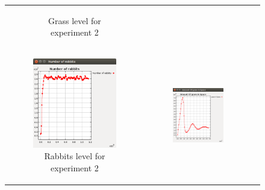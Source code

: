 \documentclass[11pt]{article}
\begin{document}
\begin{figure}
\begin{tabular}{c c c}
\begin{subfigure}[b]{0.3\textwidth}
        \caption{\label{img:grass2} Grass level for experiment 2}
    \end{subfigure}\\
    \begin{subfigure}[b]{0.3\textwidth}
        \includegraphics[width=\textwidth]{experiment/2/Rabbits.png}
        \caption{\label{img:rabbits2} Rabbits level for experiment 2}
    \end{subfigure} & 
    \begin{subfigure}[b]{0.3\textwidth}
        \includegraphics[width=\textwidth]{experiment/3/Grass.png}

\end{subfigure}
\end{tabular}
\end{figure}
\end{document}

